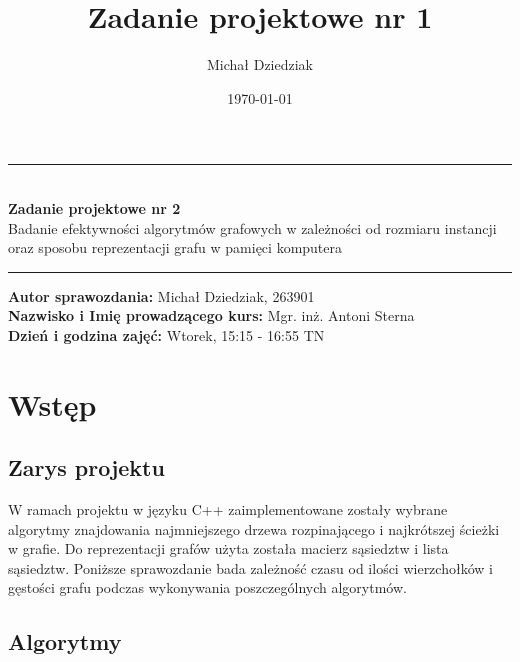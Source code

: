 \documentclass{article}
\title{Zadanie projektowe nr 1}
\author{Michał Dziedziak}
\date{\today}
\begin{document}
\begin{titlepage}
    \begin{center}
        \vspace*{5cm}
        \rule{500pt}{1pt}\\
        \vspace*{0.5cm}
        \LARGE
        \textbf{Zadanie projektowe nr 2}\\
        \Large
        Badanie efektywności algorytmów grafowych w zależności od rozmiaru instancji
        oraz sposobu reprezentacji grafu w pamięci komputera \\
        \vspace*{0.5cm}
        \rule{500pt}{1pt}
    \end{center}

    \vspace*{12cm}

    {\raggedright
        \large
        \textbf{Autor sprawozdania:} Michał Dziedziak,  263901\\
        \textbf{Nazwisko i Imię prowadzącego kurs:} Mgr. inż. Antoni Sterna\\
        \textbf{Dzień i godzina zajęć:} Wtorek, 15:15 - 16:55 TN
    }
\end{titlepage}


\tableofcontents
\listoftables


\newpage

\section{Wstęp}
    \subsection{Zarys projektu}
    W ramach projektu w języku C++ zaimplementowane zostały wybrane algorytmy znajdowania najmniejszego
    drzewa rozpinającego i najkrótszej ścieżki w grafie. Do reprezentacji grafów użyta została macierz sąsiedztw i lista sąsiedztw. 
    Poniższe sprawozdanie bada zależność czasu od ilości wierzchołków i gęstości grafu podczas wykonywania poszczególnych algorytmów.

    \subsection{Algorytmy}
\end{document}
